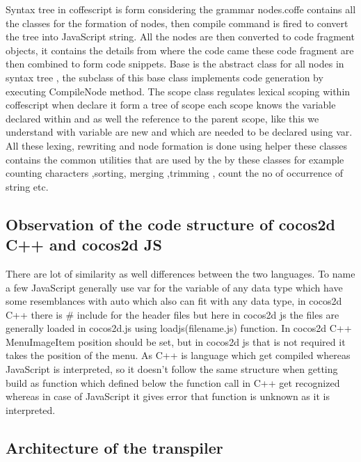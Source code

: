 \documentclass[23pt]{article}
\begin{document}
{Syntax tree in coffescript is form considering the grammar nodes.coffe contains all the classes for the formation of nodes, then compile command is fired to convert the tree into JavaScript string.
All the nodes are then converted to code fragment objects, it contains the details from where the code came these code fragment are then combined to form code snippets. Base is the abstract class for all nodes in syntax tree , the subclass of this base class implements code generation by executing CompileNode method. The scope class regulates lexical scoping within coffescript  when declare it form a tree of scope each scope knows the variable declared within and as well the reference to the parent scope, like this we understand with variable are new and which are needed to be declared using var. All these lexing, rewriting and  node formation is done using helper these classes contains the common utilities that are used by the by these classes for example counting characters ,sorting, merging ,trimming , count the no of occurrence of string etc. \\
\par}

\subsection{Observation of the code structure of cocos2d C++ and cocos2d JS}

{\Large There are lot of similarity as well differences between the two languages. To name a few JavaScript generally use var for the variable of any data type which have some resemblances with auto which also can fit with any data type, in cocos2d C++ there is \# include for the header files but here in cocos2d js the files are generally loaded in cocos2d.js using loadjs(filename.js) function. In cocos2d C++ MenuImageItem position should be set, but in cocos2d js that is not required it takes the position of the menu. As C++ is language which get compiled whereas JavaScript is interpreted, so it doesn’t  follow the same structure when getting build as function which defined below the function call in C++ get recognized whereas in case of JavaScript it gives error that function is unknown as it is interpreted.  \\ \par}

\subsection{Architecture of the transpiler }
\end{document}

